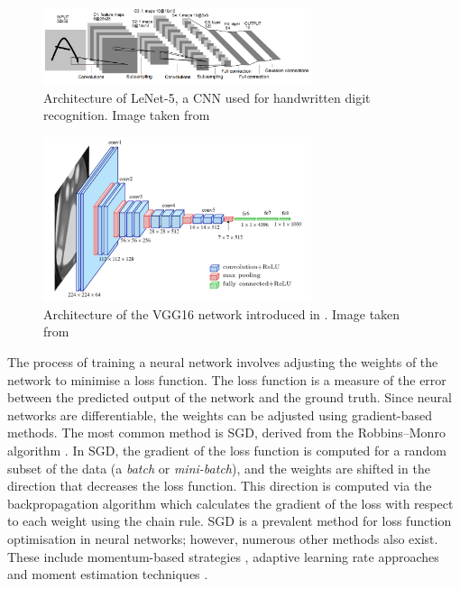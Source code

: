 \begin{figure}[htbp]
    \centering
    \includegraphics[width=0.70\textwidth]{chapter_sota/assets/lenet.png}
    \caption{Architecture of LeNet-5, a \acl{CNN} used for handwritten digit
    recognition. Image taken from \cite{DBLP:journals/pieee/LeCunBBH98}}
    \label{fig:sota:lenet5}
\end{figure}

\begin{figure}[htbp]
    \centering
    \includegraphics[width=0.7\textwidth]{chapter_sota/assets/vgg16.png}
    \caption{Architecture of the VGG16 network introduced in
    \cite{DBLP:journals/corr/SimonyanZ14a}. Image taken from
    \cite{ferguson2017automatic}}
    \label{fig:sota:vgg16}
\end{figure}


The process of training a neural network involves adjusting the weights of the
network to minimise a loss function. The loss function is a measure of the error
between the predicted output of the network and the ground truth. Since neural
networks are differentiable, the weights can be adjusted using gradient-based
methods. The most common method is \acf{SGD}, derived from the Robbins–Monro
algorithm \cite{robbins1951stochastic}. In \ac{SGD}, the gradient of the loss
function is computed for a random subset of the data (a \emph{batch} or
\emph{mini-batch}), and the weights are shifted in the direction that decreases
the loss function. This direction is computed via the backpropagation algorithm
\cite{rumelhart1986learning} which calculates the gradient of the loss with
respect to each weight using the chain rule. \acl{SGD} is a prevalent method for
loss function optimisation in neural networks; however, numerous other methods
also exist. These include momentum-based strategies
\cite{sutskever2013importance}, adaptive learning rate approaches
\cite{zeiler2012adadelta} and moment estimation techniques
\cite{kingma2014adam}.\\

